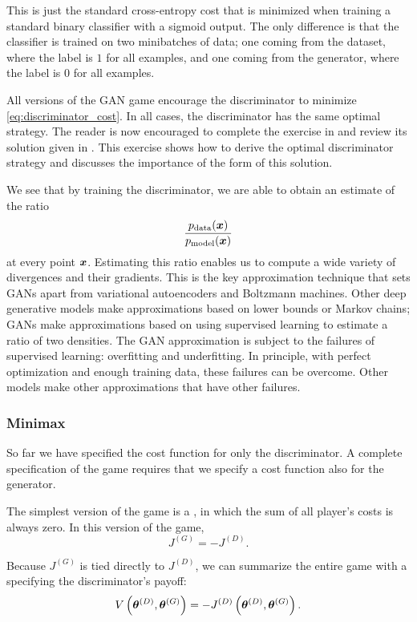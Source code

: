 This is just the standard cross-entropy cost that is minimized when training a standard binary classifier
with a sigmoid output.
The only difference is that the classifier is trained on two minibatches of data; one coming from the
dataset, where the label is $1$ for all examples, and one coming from the generator, where the label
is $0$ for all examples.

All versions of the GAN game encourage the discriminator to minimize \eqref{eq:discriminator_cost}.
In all cases, the discriminator has the same optimal strategy.
The reader is now encouraged to complete the exercise in  and review its solution
given in . This exercise shows how to derive the optimal discriminator strategy
and discusses the importance of the form of this solution.

We see that by training the discriminator, we are able to obtain an estimate of the ratio
\[
  \frac{p_{\rm{data}}({\bm{x}})}{p_{\rm{model}}({\bm{x}})}
\]
at every point ${\bm{x}}$.
Estimating this ratio enables us to compute a wide variety of divergences and their gradients.
This is the key approximation technique that sets GANs apart from variational autoencoders
and Boltzmann machines.
Other deep generative models make approximations based on lower bounds or Markov chains;
GANs make approximations based on using supervised learning to estimate a ratio of two densities.
The GAN approximation is subject to the failures of supervised learning: overfitting and underfitting.
In principle, with perfect optimization and enough training data, these failures can be overcome.
Other models make other approximations that have other failures.


\subsubsection{Minimax}

So far we have specified the cost function for only the discriminator.
A complete specification of the game requires that we specify a cost function also
for the generator.

The simplest version of the game is a , in which the sum of all player's
costs is always zero.
In this version of the game,
\begin{equation}
J^{(G)} = - J^{(D)}.
\label{eq:minimax}
\end{equation}

Because $J^{(G)}$ is tied directly to $J^{(D)}$, we can summarize the entire game with a
 specifying the discriminator's payoff:
\[ V\left({\bm{\theta}}^{(D)}, {\bm{\theta}}^{(G)} \right) = - J^{(D)} \left({\bm{\theta}}^{(D)}, {\bm{\theta}}^{(G)} \right).\]

